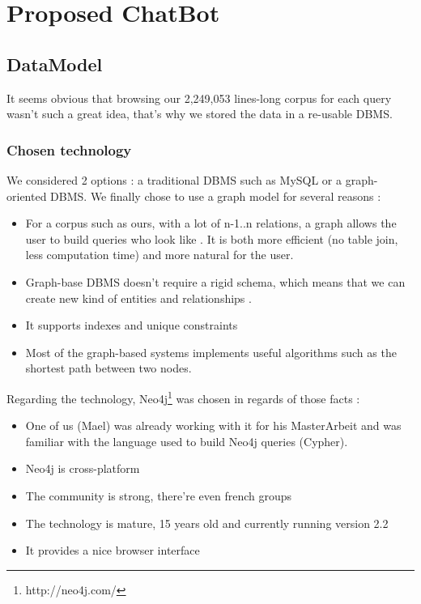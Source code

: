 \section{Proposed ChatBot}
%
\subsection{DataModel}
It seems obvious that browsing our 2,249,053 lines-long corpus for each query wasn't such a great idea, that's why we stored the data in a re-usable DBMS.
\subsubsection{Chosen technology}
We considered 2 options : a traditional DBMS such as MySQL or a graph-oriented DBMS. We finally chose to use a graph model for several reasons :
\begin{itemize}
\item For a corpus such as ours, with a lot of n-1..n relations, a graph allows the user to build queries who look like . It is both more efficient (no table join, less computation time) and more natural for the user.
\item Graph-base DBMS doesn't require a rigid schema, which means that we can create new kind of entities and relationships .
\item It supports indexes and unique constraints
\item Most of the graph-based systems implements useful algorithms such as the shortest path between two nodes.
\end{itemize}
Regarding the technology, Neo4j\footnote{http://neo4j.com/} was chosen in regards of those facts :\\
\begin{itemize}
\item One of us (Mael) was already working with it for his MasterArbeit and was familiar with the language used to build Neo4j queries (Cypher).
\item Neo4j is cross-platform
\item The community is strong, there're even french groups
\item The technology is mature, 15 years old and currently running version 2.2
\item It provides a nice browser interface
\end{itemize}

